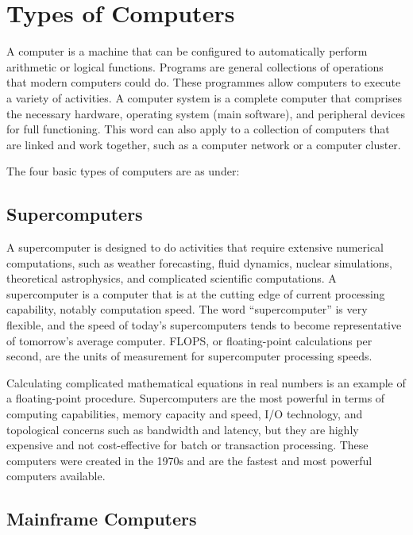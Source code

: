 \documentclass[10pt,british]{report}
\begin{document}
\section{Types of Computers}

A computer is a machine that can be configured to automatically perform
arithmetic or logical functions. Programs are general collections
of operations that modern computers could do. These programmes allow
computers to execute a variety of activities. A computer system is
a \textquotedbl complete\textquotedbl{} computer that comprises the
necessary hardware, operating system (main software), and peripheral
devices for \textquotedbl full\textquotedbl{} functioning. This word
can also apply to a collection of computers that are linked and work
together, such as a computer network or a computer cluster.

\vfill{}

\pagebreak{}

\noindent The four basic types of computers are as under:

\subsection{Supercomputers}

\noindent A supercomputer is designed to do activities that require
extensive numerical computations, such as weather forecasting, fluid
dynamics, nuclear simulations, theoretical astrophysics, and complicated
scientific computations. A supercomputer is a computer that is at
the cutting edge of current processing capability, notably computation
speed. The word \textquotedblleft supercomputer\textquotedblright{}
is very flexible, and the speed of today's supercomputers tends to
become representative of tomorrow's average computer. FLOPS, or floating-point
calculations per second, are the units of measurement for supercomputer
processing speeds.

\noindent Calculating complicated mathematical equations in real numbers
is an example of a floating-point procedure. Supercomputers are the
most powerful in terms of computing capabilities, memory capacity
and speed, I/O technology, and topological concerns such as bandwidth
and latency, but they are highly expensive and not cost-effective
for batch or transaction processing. These computers were created
in the 1970s and are the fastest and most powerful computers available.

\subsection{Mainframe Computers}
\end{document}
